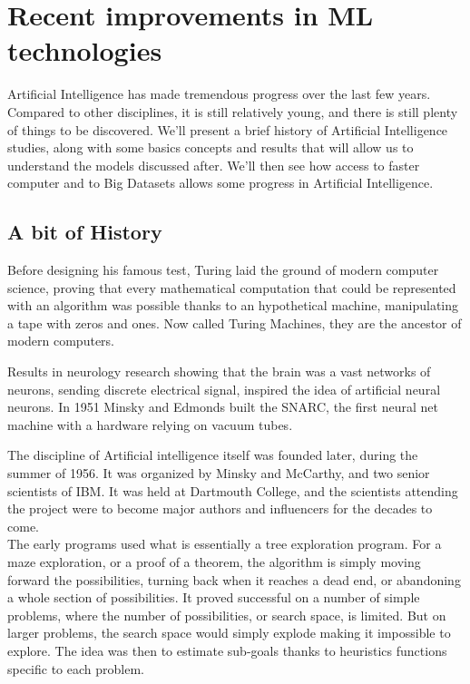 \documentclass[12pt]{article}
\begin{document}
\pagebreak


\section{Recent improvements in ML technologies}

Artificial Intelligence has made tremendous progress over the last few years.
Compared to other disciplines, it is still relatively young, and there is still
plenty of things to be discovered. We'll present a brief history of Artificial
Intelligence studies, along with some basics concepts and results that will
allow us to understand the models discussed after. We'll then see how access to
faster computer and to Big Datasets allows some progress in Artificial
Intelligence.

\subsection{A bit of History}

\smallskip

Before designing his famous test, Turing laid the ground of modern computer
science, proving that every mathematical computation that could be represented
with an algorithm was possible thanks to an hypothetical machine, manipulating
a tape with zeros and ones. Now called Turing Machines, they are the ancestor
of modern computers.\cite{Turing1936}

Results in neurology research showing that the brain was a vast networks of
neurons, sending discrete electrical signal, inspired the idea of artificial
neural neurons. In 1951 Minsky and Edmonds built the SNARC, the first neural net
machine with a hardware relying on vacuum tubes.

The discipline of Artificial intelligence itself was founded later, during the
summer of 1956. It was organized by Minsky and McCarthy, and two senior
scientists of IBM. It was held at Dartmouth College, and the scientists
attending the project were to become major authors and influencers for the
decades to come. \cite{DartMouth}\\

The early programs used what is essentially a tree exploration program. For a maze
exploration, or a proof of a theorem, the algorithm is simply moving forward the
possibilities, turning back when it reaches a dead end, or abandoning a whole
section of possibilities. It proved successful on a number of simple problems,
where the number of possibilities, or search space, is limited. But on larger
problems, the search space would simply explode making it impossible to explore.
The idea was then to estimate sub-goals thanks to heuristics functions specific to
each problem.
\end{document}
